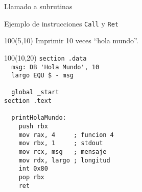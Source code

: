 \documentclass[aspectratio=169]{beamer}
\begin{document}
\begin{frame}[fragile]{Llamado a subrutinas}
\begin{textblock}{50}
    \small
    \bigskip
    \bigskip
    \end{textblock}
\end{frame}

\begin{frame}[fragile]{Ejemplo de instrucciones \texttt{Call} y \texttt{Ret}}
    \begin{textblock}{100}(5,10) \small Imprimir 10 veces ``hola mundo''.\end{textblock}
    \begin{textblock}{100}(10,20)
    \scriptsize
    \verb|section .data                 |\\ 
    \verb|  msg: DB 'Hola Mundo', 10    |\\ 
    \verb|  largo EQU $ - msg           |\\ 
    \verb|                              |\\ 
    \verb|  global _start               |\\ 
    \verb|section .text                 |\\
    \verb|                              |\\
    \verb|  printHolaMundo:             |\\
    \verb|    push rbx                  |\\
    \verb|    mov rax, 4     ; funcion 4|\\ 
    \verb|    mov rbx, 1     ; stdout   |\\ 
    \verb|    mov rcx, msg   ; mensaje  |\\ 
    \verb|    mov rdx, largo ; longitud |\\ 
    \verb|    int 0x80                  |\\
    \verb|    pop rbx                   |\\
    \verb|    ret                       |\\    
     \end{textblock}

\end{frame}
\end{document}
